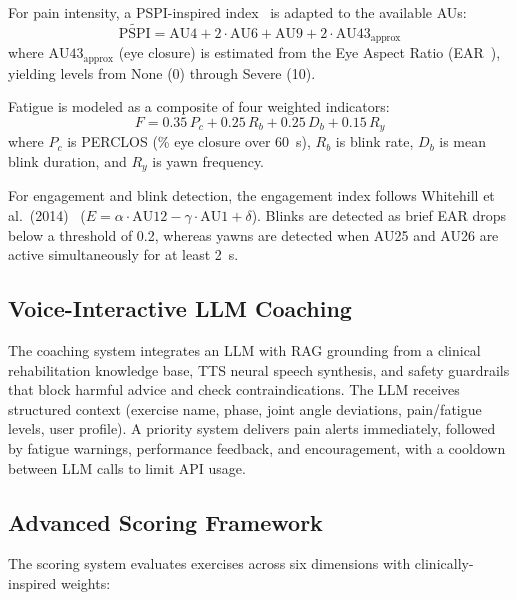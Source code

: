 For pain intensity, a PSPI-inspired index~\cite{prkachin2008structure} is adapted to the available AUs:
\begin{equation}
    \widetilde{\text{PSPI}} = \text{AU4} + 2 \cdot \text{AU6} + \text{AU9} + 2 \cdot \text{AU43}_{\text{approx}}
    \label{eq:pspi}
\end{equation}
where $\text{AU43}_{\text{approx}}$ (eye closure) is estimated from the Eye Aspect Ratio (EAR~\cite{dewi2022adjusting}), yielding levels from None (0) through Severe (10).

Fatigue is modeled as a composite of four weighted indicators:
\begin{equation}
    F = 0.35\,P_c + 0.25\,R_b + 0.25\,D_b + 0.15\,R_y
    \label{eq:fatigue}
\end{equation}
where $P_c$ is PERCLOS (\% eye closure over 60~s), $R_b$ is blink rate, $D_b$ is mean blink duration, and $R_y$ is yawn frequency.

For engagement and blink detection, the engagement index follows Whitehill et al.~(2014)~\cite{6786307} ($E = \alpha \cdot \text{AU12} - \gamma \cdot \text{AU1} + \delta$). Blinks are detected as brief EAR drops below a threshold of 0.2, whereas yawns are detected when AU25 and AU26 are active simultaneously for at least 2~s.

\subsection{Voice-Interactive LLM Coaching}
\label{subsec:llm}

The coaching system integrates an LLM with RAG grounding from a clinical rehabilitation knowledge base, TTS neural speech synthesis, and safety guardrails that block harmful advice and check contraindications. The LLM receives structured context (exercise name, phase, joint angle deviations, pain/fatigue levels, user profile). A priority system delivers pain alerts immediately, followed by fatigue warnings, performance feedback, and encouragement, with a cooldown between LLM calls to limit API usage.

\subsection{Advanced Scoring Framework}
\label{subsec:scoring}

The scoring system evaluates exercises across six dimensions with clinically-inspired weights:

